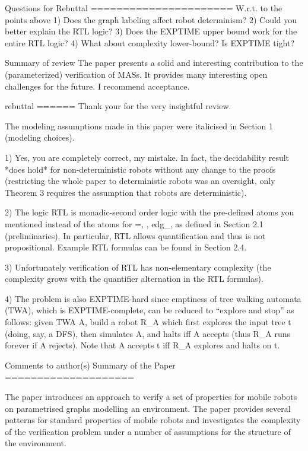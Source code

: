 Questions for Rebuttal
======================
W.r.t. to the points above
1) Does the graph labeling affect robot determinism?
2) Could you better explain the RTL logic?
3) Does the EXPTIME upper bound work for the entire RTL logic?
4) What about complexity lower-bound? Is EXPTIME tight?


Summary of review
The paper presents a solid and interesting contribution to the (parameterized) verification of MASs. It provides many interesting open challenges for the future. I recommend acceptance.



rebuttal
======
Thank your for the very insightful review. 

The modeling assumptions made in this paper were italicised in Section 1 (modeling choices). 
 
1) Yes, you are completely correct, my mistake. In fact, the decidability result *does hold* for non-deterministic robots without any change to the proofs (restricting the whole paper to deterministic robots was an oversight, only Theorem 3 requires the assumption that robots are deterministic). 

2) The logic RTL is monadic-second order logic with the pre-defined atoms you mentioned instead of the atoms for =, \epsilon, edg_\sigma, as defined in Section 2.1 (preliminaries). In particular, RTL allows quantification and thus is not propositional. Example RTL formulas can be found in Section 2.4.

3) Unfortunately verification of RTL has non-elementary complexity (the complexity grows with the quantifier alternation in the RTL formulas).

4) The problem is also EXPTIME-hard since emptiness of tree walking automata (TWA), which is EXPTIME-complete, can be reduced to ``explore and stop'' as follows: given TWA A, build a robot R_A which first explores the input tree t (doing, say, a DFS), then simulates A, and halts iff A accepts (thus R_A runs forever if A rejects). Note that A accepts t iff R_A explores and halts on t.


Comments to author(s)
Summary of the Paper
====================

The paper introduces an approach to verify a set of properties for mobile robots on parametrised graphs modelling an environment. The paper provides several patterns for standard properties of mobile robots and investigates the complexity of the verification problem under a number of assumptions for the structure of the environment.

